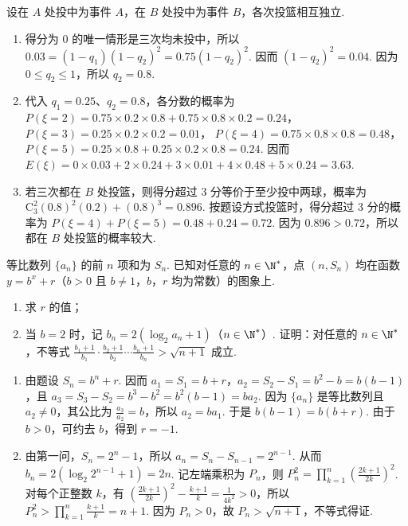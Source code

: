 \begin{solution}
设在 \(A\) 处投中为事件 \(A\)，在 \(B\) 处投中为事件 \(B\)，各次投篮相互独立.

\begin{enumerate}
\item 得分为 \(0\) 的唯一情形是三次均未投中，所以 \(0.03=(1-q_1)(1-q_2)^2=0.75(1-q_2)^2\). 因而 \((1-q_2)^2=0.04\). 因为 \(0\leqslant q_2\leqslant1\)，所以 \(q_2=0.8\).
\item 代入 \(q_1=0.25\)、\(q_2=0.8\)，各分数的概率为
\(P(\xi=2)=0.75\times0.2\times0.8+0.75\times0.8\times0.2=0.24\)，
\(P(\xi=3)=0.25\times0.2\times0.2=0.01\)，
\(P(\xi=4)=0.75\times0.8\times0.8=0.48\)，
\(P(\xi=5)=0.25\times0.8+0.25\times0.2\times0.8=0.24\). 因而
\(\displaystyle E(\xi)=0\times0.03+2\times0.24+3\times0.01+4\times0.48+5\times0.24=3.63\).
\item 若三次都在 \(B\) 处投篮，则得分超过 \(3\text{ 分}\)等价于至少投中两球，概率为 \(\displaystyle \mathrm C_3^2(0.8)^2(0.2)+(0.8)^3=0.896\). 按题设方式投篮时，得分超过 \(3\text{ 分}\)的概率为 \(P(\xi=4)+P(\xi=5)=0.48+0.24=0.72\). 因为 \(0.896>0.72\)，所以都在 \(B\) 处投篮的概率较大.
\end{enumerate}
\end{solution}

\begin{problem}
等比数列 \(\{a_{n}\}\) 的前 \(n\) 项和为 \(S_{n}\). 已知对任意的 \(n \in \N^*\)，点 \((n, S_{n})\) 均在函数 \(y = b^{x} + r\)（\(b > 0\) 且 \(b \neq 1\)，\(b\)，\(r\) 均为常数）的图象上.

\begin{enumerate}
\item 求 \(r\) 的值；
\item 当 \(b = 2\) 时，记 \(b_{n} = 2(\log_{2} a_{n} + 1)\)（\(n \in \N^*\)）. 证明：对任意的 \(n \in \N^*\)，不等式 \(\frac{b_{1} + 1}{b_{1}} \cdot \frac{b_{2} + 1}{b_{2}} \cdots \frac{b_{n} + 1}{b_{n}} > \sqrt{n + 1}\) 成立.
\end{enumerate}
\end{problem}

\begin{solution}
\begin{enumerate}
\item 由题设 \(S_n=b^n+r\). 因而 \(a_1=S_1=b+r\)，\(a_2=S_2-S_1=b^2-b=b(b-1)\)，且 \(a_3=S_3-S_2=b^3-b^2=b^2(b-1)=ba_2\). 因为 \(\{a_n\}\) 是等比数列且 \(a_2\ne0\)，其公比为 \(\frac{a_3}{a_2}=b\)，所以 \(a_2=ba_1\). 于是 \(b(b-1)=b(b+r)\). 由于 \(b>0\)，可约去 \(b\)，得到 \(r=-1\).
\item 由第一问，\(S_n=2^n-1\)，所以 \(a_n=S_n-S_{n-1}=2^{n-1}\). 从而 \(b_n=2(\log_2 2^{n-1}+1)=2n\). 记左端乘积为 \(P_n\)，则
\(\displaystyle P_n^2=\prod_{k=1}^n\left(\frac{2k+1}{2k}\right)^2\).
对每个正整数 \(k\)，有
\(\displaystyle \left(\frac{2k+1}{2k}\right)^2-\frac{k+1}{k}=\frac{1}{4k^2}>0\)，所以
\(\displaystyle P_n^2>\prod_{k=1}^n\frac{k+1}{k}=n+1\). 因为 \(P_n>0\)，故 \(P_n>\sqrt{n+1}\)，不等式得证.
\end{enumerate}
\end{solution}

